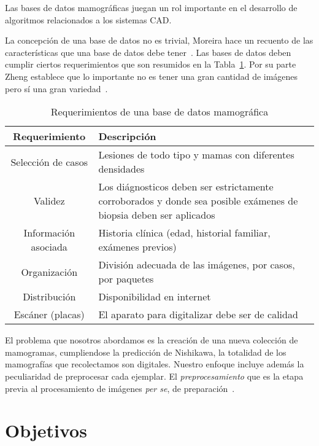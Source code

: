 Las bases de datos mamográficas juegan un rol importante en el desarrollo de
algoritmos relacionados a los sistemas CAD.

La concepción de una base de datos no es trivial, Moreira hace un recuento de
las características que una base de datos debe
tener~\cite{moreira2012compliance}. Las bases de datos deben cumplir ciertos
requerimientos que son resumidos en la Tabla~\ref{features}. Por su parte Zheng
establece que lo importante no es tener una gran cantidad de imágenes pero sí
una gran variedad~\cite{zheng2010computer}.

\begin{table}
  \caption[Requerimientos de una base de datos mamográfica]{Requerimientos de una base de datos mamográfica}
  \label{features}
\begin{center}
{\small
    \begin{tabular}{c | >{\arraybackslash}m{3.5in}}
    \hline
    {\bf Requerimiento} &
    {\bf Descripción} \\
    \hline
    Selección de casos   & Lesiones de todo tipo y mamas con diferentes densidades\\
    Validez              & Los diágnosticos deben ser estrictamente corroborados
                           y donde sea posible exámenes de biopsia deben ser aplicados\\
    Información asociada & Historia clínica (edad, historial familiar, exámenes previos)\\
    Organización         & División adecuada de las imágenes, por casos, por paquetes\\
    Distribución         & Disponibilidad en internet\\
    Escáner (placas)     & El aparato para digitalizar debe ser de calidad\\
    \hline
    \end{tabular}
}
\end{center}
\end{table}

El problema que nosotros abordamos es la creación de una nueva colección de
mamogramas, cumpliendose la predicción de Nishikawa, la totalidad de los
mamografías que recolectamos son digitales. Nuestro enfoque incluye además la
peculiaridad de preprocesar cada ejemplar. El \textit{preprocesamiento} que es
la etapa previa al procesamiento de imágenes \textit{per se}, de
preparación~\cite{ponraj2011survey}.

\section{Objetivos}

